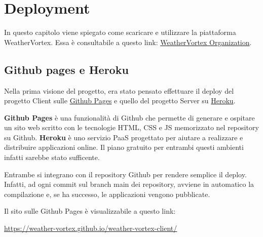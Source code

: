 

\chapter{Deployment}

In questo capitolo viene spiegato come scaricare e utilizzare la piattaforma
WeatherVortex. Essa è consultabile a questo link: \href{https://github.com/Weather-Vortex}{WeatherVortex Organization}.

\section{Github pages e Heroku}

Nella prima visione del progetto, era stato pensato effettuare il deploy del progetto Client sulle \href{https://pages.github.com/}{Github Pages} e quello del progetto Server su \href{https://www.heroku.com/home}{Heroku}.

\textbf{Github Pages} è una funzionalità di Github che permette di generare e ospitare un sito web scritto con le tecnologie HTML, CSS e JS memorizzato nel repository su Github. \textbf{Heroku} è uno servizio PaaS progettato per aiutare a realizzare e distribuire applicazioni online. Il piano gratuito per entrambi questi ambienti infatti sarebbe stato sufficente.

Entrambe si integrano con il repository Github per rendere semplice il deploy. Infatti, ad ogni commit sul branch main dei repository, avviene in automatico la compilazione e, se ha successo, le applicazioni vengono pubblicate. 

Il sito sulle Github Pages è visualizzabile a questo link:

\href{https://weather-vortex.github.io/weather-vortex-client/}{https://weather-vortex.github.io/weather-vortex-client/}

